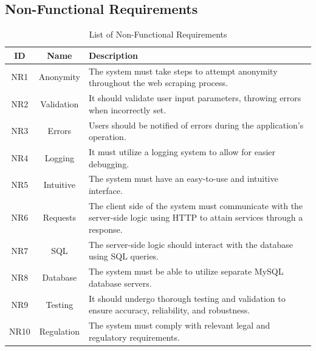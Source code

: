 \documentclass{thesis-ekf}
\theoremstyle{definition}
\theoremstyle{remark}
\begin{document}
\subsection{Non-Functional Requirements}
\begin{table}[H]
	\centering
	\begin{tabular}{|c|c|>{\raggedright\arraybackslash}p{10cm}|}
		\hline
		\textbf{ID} & \textbf{Name} & \textbf{Description} \\
		\hline
		NR1 & Anonymity & The system must take steps to attempt anonymity throughout the web scraping process. \\
		\hline
		NR2 & Validation & It should validate user input parameters, throwing errors when incorrectly set. \\
		\hline
		NR3 & Errors & Users should be notified of errors during the application's operation. \\
		\hline
		NR4 & Logging & It must utilize a logging system to allow for easier debugging. \\
		\hline
		NR5 & Intuitive & The system must have an easy-to-use and intuitive interface. \\
		\hline
		NR6 & Requests & The client side of the system must communicate with the server-side logic using HTTP to attain services through a response. \\
		\hline
		NR7 & SQL & The server-side logic should interact with the database using SQL queries. \\
		\hline
		NR8 & Database & The system must be able to utilize separate MySQL database servers. \\
		\hline
		NR9 & Testing & It should undergo thorough testing and validation to ensure accuracy, reliability, and robustness. \\
		\hline
		NR10 & Regulation & The system must comply with relevant legal and regulatory requirements. \\
		\hline
	\end{tabular}
	\caption{List of Non-Functional Requirements}
	\label{table-non-funct-req}
\end{table}
\end{document}
